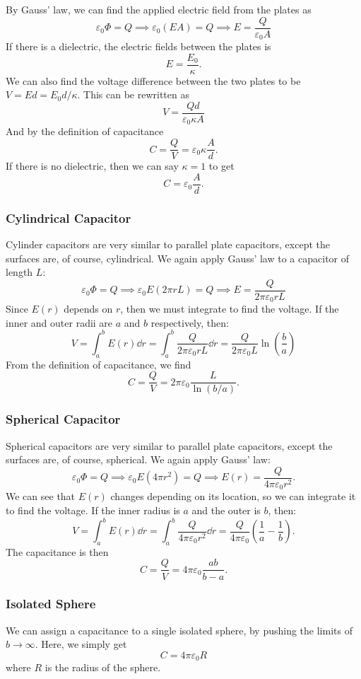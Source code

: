 \documentclass[12pt]{article}
\begin{document}
  \noindent By Gauss' law, we can find the applied electric field from the plates as 
  \[\varepsilon_0 \Phi = Q\implies \varepsilon_0 (EA) = Q\implies E = \frac{Q}{\varepsilon_0 A}\]
  If there is a dielectric, the electric fields between the plates is 
  \[E = \frac{E_0}{\kappa}.\]
  We can also find the voltage difference between the two plates to be $V = Ed = E_0 d/\kappa$. This can be rewritten as 
  \[V = \frac{Qd}{\varepsilon_0 \kappa A}\]
  And by the definition of capacitance 
  \[C = \frac{Q}{V} = \varepsilon_0 \kappa \frac{A}{d}.\]
  If there is no dielectric, then we can say $\kappa = 1$ to get 
  \[C = \varepsilon_0 \frac{A}{d}.\]
  \subsubsection{Cylindrical Capacitor}
  Cylinder capacitors are very similar to parallel plate capacitors, except the surfaces are, of course, cylindrical. We again apply Gauss' law to a capacitor of length $L$:
  \[\varepsilon_0 \Phi = Q \implies \varepsilon_0 E (2\pi rL) = Q\implies E = \frac{Q}{2\pi \varepsilon_0 rL}\]
  Since $E(r)$ depends on $r$, then we must integrate to find the voltage. If the inner and outer radii are $a$ and $b$ respectively, then:
  \[V = \int_{a}^{b} E(r) \dd r = \int_{a}^{b} \frac{Q}{2\pi \varepsilon_0 rL} \dd r= \frac{Q}{2\pi \varepsilon_0 L} \ln \left(\frac{b}{a}\right)\]
  From the definition of capacitance, we find 
  \[C = \frac{Q}{V} = 2\pi \varepsilon_0 \frac{L}{\ln (b/a)}.\]
  \subsubsection{Spherical Capacitor}
  Spherical capacitors are very similar to parallel plate capacitors, except the surfaces are, of course, spherical. We again apply Gauss' law:
  \[\varepsilon_0 \Phi = Q\implies \varepsilon_0 E (4\pi r^2) = Q\implies E(r) = \frac{Q}{4\pi \varepsilon_0 r^2}.\]
  We can see that $E(r)$ changes depending on its location, so we can integrate it to find the voltage. If the inner radius is $a$ and the outer is $b$, then:
  \[V = \int_{a}^{b}E(r) \dd r = \int_{a}^{b} \frac{Q}{4\pi \varepsilon_0 r^2} \dd r = \frac{Q}{4\pi \varepsilon_0} \left(\frac{1}{a} - \frac{1}{b}\right).\]
  The capacitance is then 
  \[C = \frac{Q}{V} = 4\pi \varepsilon_0 \frac{ab}{b - a}.\]
  \subsubsection{Isolated Sphere}
  We can assign a capacitance to a single isolated sphere, by pushing the limits of $b \to \infty$. Here, we simply get 
  \[C = 4\pi \varepsilon_0 R\]
  where $R$ is the radius of the sphere. 
\end{document}
